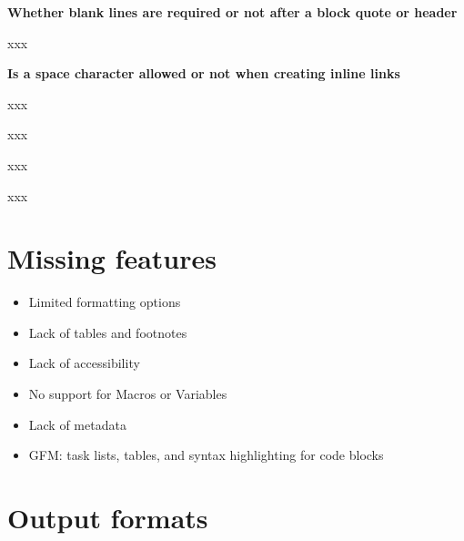\textbf{Whether blank lines are required or not after a block quote or header}\newline

xxx\newline

\textbf{Is a space character allowed or not when creating inline links}\newline

xxx\newline

\textbf{}\newline

xxx\newline

\textbf{}\newline

xxx\newline

\textbf{}\newline

xxx\newline

\section{Missing features}

\begin{itemize}
    \item Limited formatting options
    \item Lack of tables and footnotes
    \item Lack of accessibility
    \item No support for Macros or Variables
    \item Lack of metadata
    \item GFM: task lists, tables, and syntax highlighting for code blocks
\end{itemize}

\section{Output formats}

